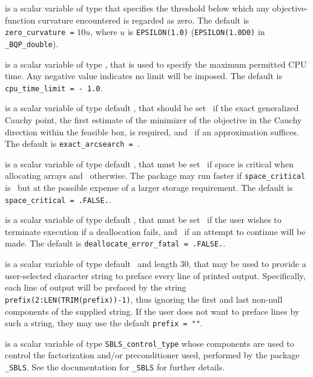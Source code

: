 \documentclass{galahad}
\newcommand{\packagename}{BQP}
\newcommand{\fullpackagename}{\libraryname\_\packagename}
\begin{document}
\begin{description}
 is a scalar variable of type \realdp
that specifies the threshold below which any objective-function curvature
encountered is regarded as zero.
The default is {\tt zero\_curvature =} $10 u$,
where $u$ is {\tt EPSILON(1.0)} ({\tt EPSILON(1.0D0)} in 
{\tt \fullpackagename\_double}).

 is a scalar variable of type \realdp, 
that is used to specify the maximum permitted CPU time. Any negative
value indicates no limit will be imposed. The default is 
{\tt cpu\_time\_limit = - 1.0}.

 is a scalar variable of type default \logical, that should
be set \true\ if the exact generalized Cauchy point,
the first estimate of the minimizer of the objective in the
Cauchy direction within
the feasible box, is required, and \false\ if an approximation suffices.
The default is {\tt exact\_arcsearch = \true}.

 is a scalar variable of type default \logical, 
that must be set \true\ if space is critical when allocating arrays
and  \false\ otherwise. The package may run faster if 
{\tt space\_critical} is \false\ but at the possible expense of a larger
storage requirement. The default is {\tt space\_critical = .FALSE.}.

 is a scalar variable of type default \logical, 
that must be set \true\ if the user wishes to terminate execution if
a deallocation  fails, and \false\ if an attempt to continue
will be made. The default is {\tt deallocate\_error\_fatal = .FALSE.}.

 is a scalar variable of type default \character\
and length 30, that may be used to provide a user-selected 
character string to preface every line of printed output. 
Specifically, each line of output will be prefaced by the string 
{\tt prefix(2:LEN(TRIM(prefix))-1)},
thus ignoring the first and last non-null components of the
supplied string. If the user does not want to preface lines by such
a string, they may use the default {\tt prefix = ""}.

 is a scalar variable of type 
{\tt SBLS\_control\_type} %
whose components are used to control the factorization and/or
preconditioner used,
performed by the package 
{\tt \libraryname\_SBLS}. 
See the documentation for {\tt \libraryname\_SBLS} for further details.

\end{description}
\end{document}
